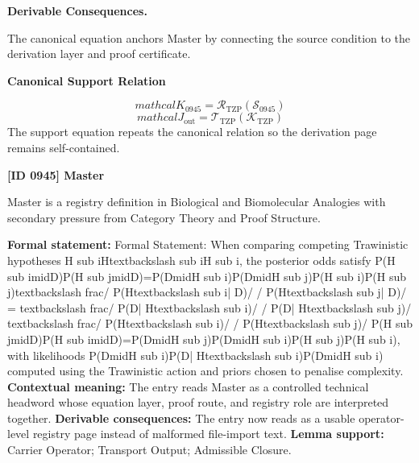 \par\vspace{0.35em}
\noindent\textbf{Derivable Consequences.}\quad
\begingroup
\footnotesize
\raggedright
The canonical equation anchors Master by connecting the source condition to the derivation layer and proof certificate.
\par\endgroup

\noindent\textbf{Canonical Support Relation}\par
\[
mathcal{K}_{0945}=\mathcal{R}_{\mathrm{TZP}}\!\left(\mathcal{S}_{0945}\right)
\]
\[
mathcal{J}_{\mathrm{out}} = \mathcal{T}_{\mathrm{TZP}}\!\left(\mathcal{K}_{\mathrm{TZP}}\right)
\]
\noindent The support equation repeats the canonical relation so the derivation page remains self-contained.\par

\clearpage
\noindent\textbf{[ID 0945] Master}\par
\vspace{0.35em}
\begingroup\small
{}
Master is a registry definition in Biological and Biomolecular Analogies with secondary pressure from Category Theory and Proof Structure.

\begingroup\footnotesize\setlength{\emergencystretch}{3em}\sloppy
\textbf{Formal statement:} Formal Statement: When comparing competing Trawinistic hypotheses H sub iHtextbackslash sub iH sub i, the posterior odds satisfy P(H sub imidD)P(H sub jmidD)=P(DmidH sub i)P(DmidH sub j)P(H sub i)P(H sub j)textbackslash frac/ P(Htextbackslash sub i| D)/ / P(Htextbackslash sub j| D)/ = textbackslash frac/ P(D| Htextbackslash sub i)/ / P(D| Htextbackslash sub j)/ textbackslash frac/ P(Htextbackslash sub i)/ / P(Htextbackslash sub j)/ P(H sub jmidD)P(H sub imidD)=P(DmidH sub j)P(DmidH sub i)P(H sub j)P(H sub i), with likelihoods P(DmidH sub i)P(D| Htextbackslash sub i)P(DmidH sub i) computed using the Trawinistic action and priors chosen to penalise complexity. \textbf{Contextual meaning:} The entry reads Master as a controlled technical headword whose equation layer, proof route, and registry role are interpreted together. \textbf{Derivable consequences:} The entry now reads as a usable operator-level registry page instead of malformed file-import text. \textbf{Lemma support:} Carrier Operator; Transport Output; Admissible Closure.\par
\endgroup

